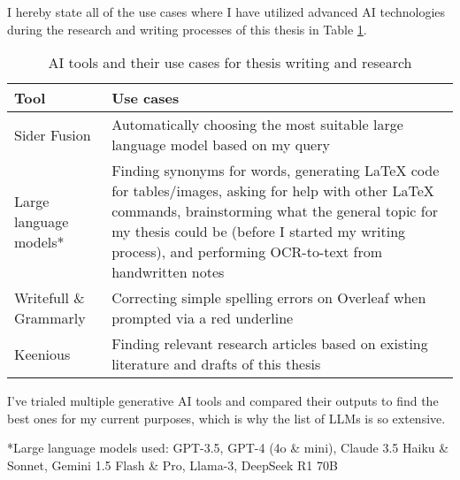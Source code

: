 

\begin{comment}
\end{comment}


I hereby state all of the use cases where I have utilized advanced AI technologies during the research and writing processes of this thesis in Table \ref{table:declaration}.


\begin{table}[ht!] 
\centering 
\renewcommand{\arraystretch}{1.5} %
\setlength{\tabcolsep}{5pt} %
\begin{tabularx}{\textwidth}{|l|X|} %
\hline  
\textbf{Tool} & \textbf{Use cases} \\ \hline  
Sider Fusion & Automatically choosing the most suitable large language model based on my query\\ \hline  
Large language models* & Finding synonyms for words, generating LaTeX code for tables/images, asking for help with other LaTeX commands, brainstorming what the general topic for my thesis could be (before I started my writing process), and performing OCR-to-text from handwritten notes\\ \hline  
Writefull \& Grammarly & Correcting simple spelling errors on Overleaf when prompted via a red underline\\ \hline  
Keenious & Finding relevant research articles based on existing literature and drafts of this thesis\\ \hline  
\end{tabularx}  
\caption{AI tools and their use cases for thesis writing and research}  
\label{table:declaration}  
\end{table}  

I’ve trialed multiple generative AI tools and compared their outputs to find the best ones for my current
purposes, which is why the list of LLMs is so extensive.

*Large language models used: GPT-3.5, GPT-4 (4o \& mini), Claude 3.5 Haiku \& Sonnet, Gemini 1.5 Flash \& Pro, Llama-3, DeepSeek R1 70B